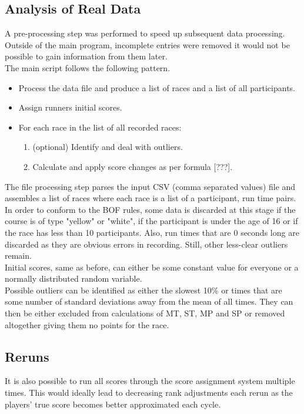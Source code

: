 \subsection{Analysis of Real Data}
A pre-processing step was performed to speed up subsequent data processing. Outside of the main program, incomplete entries were removed it would not be possible to gain information from them later.\\
The main script follows the following pattern.
\begin{itemize}
\item Process the data file and produce a list of races and a list of all participants.
\item Assign runners initial scores.
\item For each race in the list of all recorded races:
	\begin{enumerate}
	\item (optional) Identify and deal with outliers.
	\item Calculate and apply score changes as per formula [???].
	\end{enumerate}
\end{itemize}
The file processing step parses the input CSV (comma separated values) file and assembles a list of races where each race is a list of a participant, run time pairs. In order to conform to the BOF rules, some data is discarded at this stage if the course is of type "yellow" or "white", if the participant is under the age of 16 or if the race has less than 10 participants. Also, run times that are 0 seconds long are discarded as they are obvious errors in recording. Still, other less-clear outliers remain.\\
Initial scores, same as before, can either be some constant value for everyone or a normally distributed random variable.\\
Possible outliers can be identified as either the slowest 10\% or times that are some number of standard deviations away from the mean of all times. They can then be either excluded from calculations of MT, ST, MP and SP or removed altogether giving them no points for the race.

\subsection{Reruns}
It is also possible to run all scores through the score assignment system multiple times. This would ideally lead to decreasing rank adjustments each rerun as the players' true score becomes better approximated each cycle.  